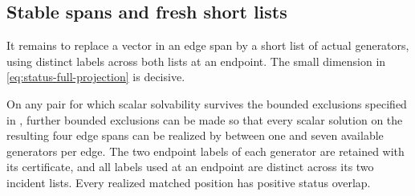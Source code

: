 \subsection{Stable spans and fresh short lists}

It remains to replace a vector in an edge span by a short list of actual
generators, using distinct labels across both lists at an endpoint.
The small dimension in \eqref{eq:status-full-projection} is decisive.

\begin{lemma}
\label{lem:fresh-lists}
On any pair for which scalar solvability survives the bounded exclusions
specified in , further bounded exclusions can be made so that every scalar solution on the resulting
four edge spans can be realized by between one and seven available
generators per edge. The two endpoint labels of each generator are
retained with its certificate, and all labels used at an endpoint are
distinct across its two incident lists. Every realized matched
position has positive status overlap.
\end{lemma}

